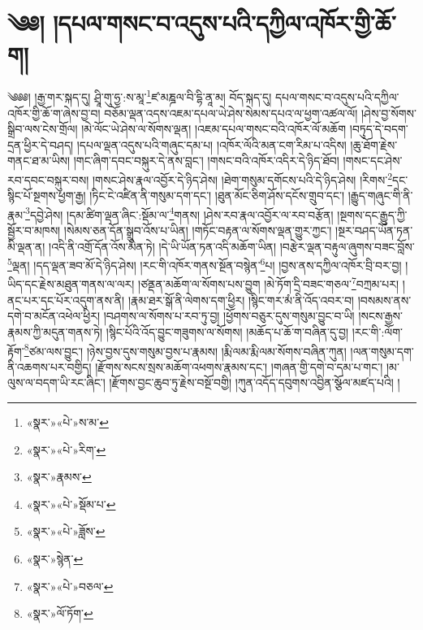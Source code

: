 \chapter{༄༅། །དཔལ་གསང་བ་འདུས་པའི་དཀྱིལ་འཁོར་གྱི་ཆོ་ག།}༄༅༅། །རྒྱ་གར་སྐད་དུ། ཤྲཱི་གུ་ཧྱ་:ས་མཱ་\footnote{«སྣར་»«པེ་»ས་མ་}ཛ་མཎྜལ་བི་དྷི་ནཱ་མ། བོད་སྐད་དུ། དཔལ་གསང་བ་འདུས་པའི་དཀྱིལ་འཁོར་གྱི་ཆོ་ག་ཞེས་བྱ་བ། བཅོམ་ལྡན་འདས་འཇམ་དཔལ་ཡེ་ཤེས་སེམས་དཔའ་ལ་ཕྱག་འཚལ་ལོ། །ཤེས་བྱ་སོགས་སྒྲིབ་ལས་ངེས་གྲོལ། །མེ་ལོང་ཡེ་ཤེས་ལ་སོགས་ལྡན། །འཇམ་དཔལ་གསང་བའི་འཁོར་ལོ་མཆོག །བཏུད་དེ་བདག་དྲན་ཕྱིར་དེ་བཤད། །དཔལ་ལྡན་འདུས་པའི་གཞུང་དམ་པ། །འཁོར་ལོའི་མན་ངག་རིམ་པ་འདིས། །ཆུ་ཐོག་རྗེས་གནང་ཐ་མ་ཡིས། །གང་ཞིག་དབང་བསྐུར་དེ་ནས་བླང་། །གསང་བའི་འཁོར་འདིར་དེ་ཉིད་ཐོབ། །གསང་དང་ཤེས་རབ་དབང་བསྐུར་བས། །གསང་ཤེས་རྣལ་འབྱོར་དེ་ཉིད་ཤེས། །ཐེག་གསུམ་དགོངས་པའི་དེ་ཉིད་ཤེས། །རིགས་\footnote{«སྣར་»«པེ་»རིག་}དང་སྙིང་པོ་སྔགས་ཕྱག་རྒྱ། །ཏིང་ངེ་འཛིན་ནི་གསུམ་དག་དང་། །ཐུན་མོང་ཅིག་ཤོས་དངོས་གྲུབ་དང་། །རྒྱུད་གཞུང་གི་ནི་རྣམ་\footnote{«སྣར་»རྣམས་}དབྱེ་ཤེས། །དམ་ཚིག་ལྡན་ཞིང་:སྡོམ་ལ་\footnote{«སྣར་»«པེ་»སྡོམ་པ་}གནས། །ཤེས་རབ་རྣལ་འབྱོར་ལ་རབ་བརྩོན། །སྔགས་དང་རྒྱུད་ཀྱི་སྦྱོར་བ་མཁས། །སེམས་ཅན་དོན་སྒྲུབ་འོས་པ་ཡིན། །གཏོང་བརྟན་ལ་སོགས་ལྡན་གྱུར་ཀྱང་། །སྔར་བཤད་ཡོན་ཏན་མི་ལྡན་ན། །འདི་ནི་འགྲོ་དོན་འོས་མིན་ཏེ། །དེ་ཡི་ཡོན་ཏན་འདི་མཆོག་ཡིན། །བརྩེར་ལྡན་བརྟུལ་ཞུགས་བཟང་བློས་\footnote{«སྣར་»«པེ་»ཟློས་}ལྡན། །དད་ལྡན་ཟབ་མོ་དེ་ཉིད་ཤེས། །རང་གི་འཁོར་གནས་སྔོན་བསྙེན་\footnote{«སྣར་»སྙེན་}པ། །བྱས་ནས་དཀྱིལ་འཁོར་བྲི་བར་བྱ། །ཡིད་དང་རྗེས་མཐུན་གནས་ལ་ལར། །ཙནྡན་མཆོག་ལ་སོགས་པས་བྱུག །མེ་ཏོག་དྲི་བཟང་གཅལ་\footnote{«སྣར་»«པེ་»བཅལ་}བཀྲམ་པར། །ནང་པར་དང་པོར་འདུག་ནས་ནི། །རྣམ་ཐར་སྒོ་ནི་ལེགས་དག་ཕྱིར། །སྙིང་གར་མཾ་ནི་འོད་འབར་བ། །བསམས་ནས་དགེ་བ་མངོན་འཕེལ་ཕྱིར། །བཤགས་ལ་སོགས་པ་རབ་ཏུ་བྱ། །ཕྱོགས་བཅུར་དུས་གསུམ་བྱུང་བ་ཡི། །སངས་རྒྱས་རྣམས་ཀྱི་མདུན་གནས་ཏེ། །སྙིང་པོའི་འོད་བྱུང་གཟུགས་ལ་སོགས། །མཆོད་པ་ཆོ་ག་བཞིན་དུ་བྱ། །རང་གི་:ལོག་རྟོག་\footnote{«སྣར་»ལོ་ཏོག་}ཙམ་ལས་བྱུང་། །ཉེས་བྱས་དུས་གསུམ་བྱས་པ་རྣམས། །རྨི་ལམ་རྨི་ལམ་སོགས་བཞིན་ཀུན། །ལན་གསུམ་དག་ནི་འཆགས་པར་བགྱིད། །རྫོགས་སངས་སྲས་མཆོག་འཕགས་རྣམས་དང་། །གཞན་གྱི་དགེ་བ་དམ་པ་གང་། །མ་ལུས་ལ་བདག་ཡི་རང་ཞིང་། །རྫོགས་བྱང་ཆུབ་ཏུ་རྗེས་བསྔོ་བགྱི། །ཀུན་འདོད་དབུགས་འབྱིན་སྩོལ་མཛད་པའི། །
